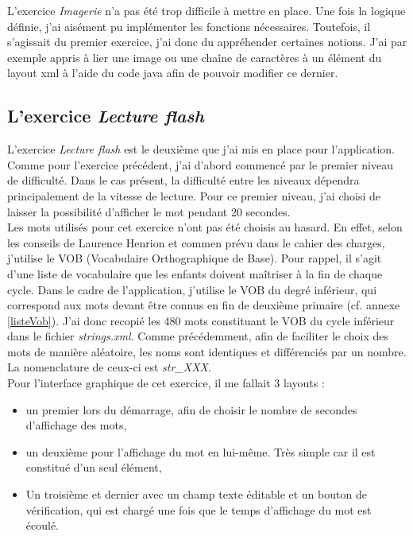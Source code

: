 L'exercice \textit{Imagerie} n'a pas été trop difficile à mettre en place. Une fois la logique définie, j'ai aisément pu implémenter les fonctions nécessaires. Toutefois, il s'agissait du premier exercice, j'ai donc du appréhender certaines notions. J'ai par exemple appris à lier une image ou une chaîne de caractères à un élément du layout xml à l'aide du code java afin de pouvoir modifier ce dernier.

\subsection{L'exercice \textit{Lecture flash}}
L'exercice \textit{Lecture flash} est le deuxième que j'ai mis en place pour l'application. Comme pour l'exercice précédent, j'ai d'abord commencé par le premier niveau de difficulté. Dans le cas présent, la difficulté entre les niveaux dépendra principalement de la vitesse de lecture. Pour ce premier niveau, j'ai choisi de laisser la possibilité d'afficher le mot pendant 20 secondes.\\

Les mots utilisés pour cet exercice n'ont pas été choisis au hasard. En effet, selon les conseils de Laurence Henrion et commen prévu dans le cahier des charges, j'utilise le VOB (Vocabulaire Orthographique de Base). Pour rappel, il s'agit d'une liste de vocabulaire que les enfants doivent maîtriser à la fin de chaque cycle. Dans le cadre de l'application, j'utilise le VOB du degré inférieur, qui correspond aux mots devant être connus en fin de deuxième primaire (cf. annexe \ref{listeVob}). J'ai donc recopié les 480 mots constituant le VOB du cycle inférieur dans le fichier \textit{strings.xml}. Comme précédemment, afin de faciliter le choix des mots de manière aléatoire, les noms sont identiques et différenciés par un nombre. La nomenclature de ceux-ci est \textit{str\_XXX}. \\

Pour l'interface graphique de cet exercice, il me fallait 3 layouts :
\begin{itemize}
\item un premier lors du démarrage, afin de choisir le nombre de secondes d'affichage des mots,
\item un deuxième pour l'affichage du mot en lui-même. Très simple car il est constitué d'un seul élément,
\item Un troisième et dernier avec un champ texte éditable et un bouton de vérification, qui est chargé une fois que le temps d'affichage du mot est écoulé.\\
\end{itemize}

